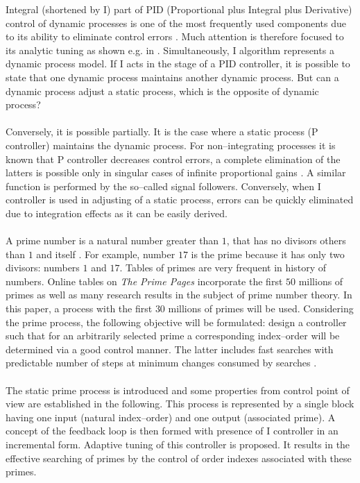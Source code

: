 \documentclass[12pt,a4paper,twoside]{article}
\begin{document}
\vspace{0.3cm}\noindent Integral (shortened by I) part of PID (Proportional plus Integral plus Derivative) control of dynamic processes is one of the most frequently used components due to its ability to eliminate control errors \cite{sem}. Much attention is therefore focused to its analytic tuning  as shown e.g. in \cite{odw}. Simultaneously, I algorithm represents a dynamic process model. If I acts in the stage of a PID controller, it is possible to state that one dynamic process maintains another dynamic process. But can a dynamic process adjust a static process, which is the opposite of dynamic process?\\
\\
Conversely, it is possible partially. It is the case where a static process (P controller) maintains the dynamic process. For non--integrating processes it is known that P controller decreases control errors, a complete elimination of the latters is possible only in singular cases of infinite proportional gains \cite{kg1}. A similar function is performed by the so--called signal followers. Conversely, when I controller is used in adjusting of a static process, errors can be quickly eliminated due to integration effects as it can be easily derived.\\   
\\
A prime number is a natural number greater than $1$, that has no divisors others than $1$ and itself \cite{cogu}. For example, number $17$ is the prime because it has only two divisors: numbers $1$ and $17$. Tables of primes are very frequent in history of numbers. Online tables on {\it The Prime Pages} incorporate the first $50$ millions of primes as well as many research results in the subject of prime number theory. In this paper, a process with the first $30$ millions of primes will be used. Considering the prime process, the following objective will be formulated: design a controller such that for an arbitrarily selected prime a corresponding index--order will be determined via a good control manner. The latter includes fast searches with predictable number of steps at minimum changes consumed by searches \cite{mmi}.\\
\\
The static prime process is introduced and some properties from control point of view are established in the following. This process is represented by a single block having one input (natural index--order) and one output (associated prime). A concept of the feedback loop is then formed with presence of I controller in an incremental form. Adaptive tuning of this controller is proposed. It results in the effective searching of primes by the control of order indexes associated with these primes.   
\end{document}
